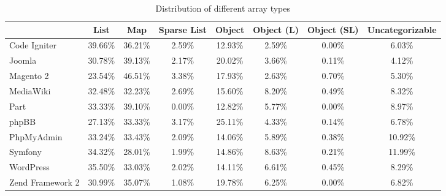 \begin{table}[htbp]
\begin{adjustbox}{center}
\begin{tabular}{l | c c c c c c c}
    &   List    &   Map &   Sparse List &   Object  &   Object (L)   &   Object (SL)   &   Uncategorizable \\
\hline \hline
Code Igniter    &   39.66\% &   36.21\% &   2.59\%  &   12.93\% &   2.59\%  &   0.00\%  &   6.03\% \\
Joomla          &   30.78\% &   39.13\% &	2.17\%	&   20.02\% &	3.66\%	&   0.11\%  &   4.12\% \\
Magento 2	    &   23.54\% &   46.51\% &	3.38\%	&   17.93\% &	2.63\%	&   0.70\%  &   	5.30\% \\
MediaWiki	    &   32.48\%	&   32.23\% &	2.69\%	&   15.60\% &	8.20\%	&   0.49\%  &   	8.32\% \\
Part	        &   33.33\%	&   39.10\% &	0.00\%	&   12.82\% &	5.77\%	&   0.00\%  &   	8.97\% \\
phpBB	        &   27.13\%	&   33.33\% &	3.17\%	&   25.11\% &	4.33\%	&   0.14\%  &   	6.78\% \\
PhpMyAdmin	    &   33.24\%	&   33.43\% &	2.09\%	&   14.06\% &	5.89\%	&   0.38\%  &   	10.92\% \\
Symfony	        &   34.32\%	&   28.01\% &	1.99\%	&   14.86\% &	8.63\%	&   0.21\%  &   	11.99\% \\
WordPress	    &   35.50\%	&   33.03\% &	2.02\%	&   14.11\% &	6.61\%	&   0.45\%  &   	8.29\% \\
Zend Framework 2&	30.99\%	&   35.07\% &	1.08\%	&   19.78\% &	6.25\%	&   0.00\%  &   	6.82\% 
\end{tabular}
\end{adjustbox}
\caption{Distribution of different array types}
\label{tab:array_types}
\end{table}

